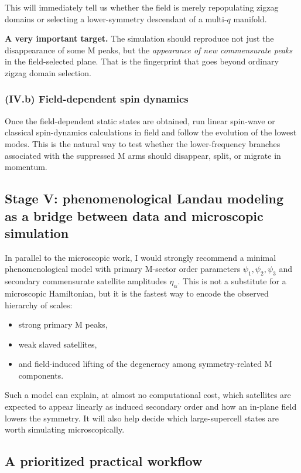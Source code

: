 \documentclass[11pt]{article}
\begin{document}
This will immediately tell us whether the field is merely repopulating zigzag domains or selecting a lower-symmetry descendant of a multi-$q$ manifold.

\textbf{A very important target.} The simulation should reproduce not just the disappearance of some M peaks, but the \emph{appearance of new commensurate peaks} in the field-selected plane. That is the fingerprint that goes beyond ordinary zigzag domain selection.

\subsubsection*{(IV.b) Field-dependent spin dynamics}

Once the field-dependent static states are obtained, run linear spin-wave or classical spin-dynamics calculations in field and follow the evolution of the lowest modes. This is the natural way to test whether the lower-frequency branches associated with the suppressed M arms should disappear, split, or migrate in momentum.

\subsection{Stage V: phenomenological Landau modeling as a bridge between data and microscopic simulation}

In parallel to the microscopic work, I would strongly recommend a minimal phenomenological model with primary M-sector order parameters $\psi_1,\psi_2,\psi_3$ and secondary commensurate satellite amplitudes $\eta_\alpha$. This is not a substitute for a microscopic Hamiltonian, but it is the fastest way to encode the observed hierarchy of scales:
\begin{itemize}[leftmargin=2em,itemsep=0.35em]
    \item strong primary M peaks,
    \item weak slaved satellites,
    \item and field-induced lifting of the degeneracy among symmetry-related M components.
\end{itemize}

Such a model can explain, at almost no computational cost, which satellites are expected to appear linearly as induced secondary order and how an in-plane field lowers the symmetry. It will also help decide which large-supercell states are worth simulating microscopically.

\subsection{A prioritized practical workflow}
\end{document}
